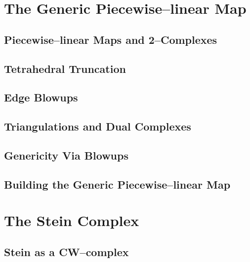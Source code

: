 \label{cha:alg1}



\section{The Generic Piecewise--linear Map}
\label{sec:proj}


	\subsection{Piecewise--linear Maps and 2--Complexes}
	\label{sub:2complex}
	
	
	\subsection{Tetrahedral Truncation}
	\label{sub:truncttet}
	
	
	\subsection{Edge Blowups}
	\label{sub:edgeblowup}
	
	
	\subsection{Triangulations and Dual Complexes}
	\label{sub:tridual}
	
	
	\subsection{Genericity Via Blowups}
	\label{sub:genericity}
	
	
	\subsection{Building the Generic Piecewise--linear Map}
	\label{sub:genericplmap}
	

\section{The Stein Complex}
\label{sec:stein}


	\subsection{Stein as a CW--complex}
	\label{sub:zero}
	

